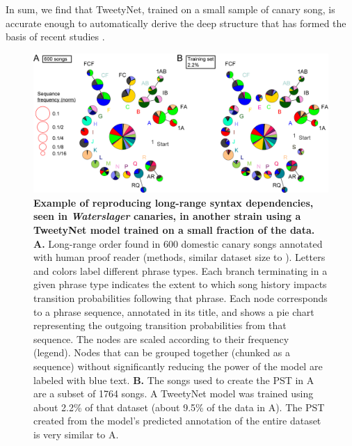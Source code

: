 \documentclass[10pt,letterpaper]{article}
\begin{document}
In sum, we find that TweetyNet, trained on a small sample of canary song, is accurate enough to automatically derive the deep structure that has formed the basis of recent studies \cite{markowitz_long-range_2013,cohen_hidden_2020}.




\begin{figure}[!h]
\includegraphics[scale=0.85]{Figures/fig8/Figure8_v7.png}
\caption{{\bf Example of reproducing long-range syntax dependencies, seen in \textit{Waterslager} canaries, in another strain using a TweetyNet model trained on a small fraction of the data.}
\textbf{A.} Long-range order found in 600 domestic canary songs annotated with human proof reader (methods, similar dataset size to \cite{markowitz_long-range_2013}). Letters and colors label different phrase types. Each branch terminating in a given phrase type indicates the extent to which song history impacts transition probabilities following that phrase. Each node corresponds to a phrase sequence, annotated in its title, and shows a pie chart representing the outgoing transition probabilities from that sequence. The nodes are scaled according to their frequency (legend). Nodes that can be grouped together (chunked as a sequence) without significantly reducing the power of the model are labeled with blue text.
\textbf{B.} The songs used to create the PST in A are a subset of 1764 songs. A TweetyNet model was trained using about 2.2\% of that dataset (about 9.5\% of the data in A). The PST created from the model's predicted annotation of the entire dataset is very similar to A.}
\label{fig8}
\end{figure}
\end{document}

